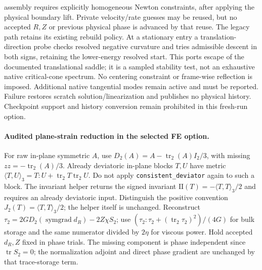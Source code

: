 \documentclass[11pt]{article}
\begin{document}
assembly requires explicitly homogeneous Newton constraints, after applying the
physical boundary lift. Private velocity/rate guesses may be reused, but no
accepted $R,Z$ or previous physical phase is advanced by that reuse.
The legacy path retains its existing rebuild policy.
At a stationary entry a translation-direction probe checks resolved negative
curvature and tries admissible descent in both signs, retaining the lower-energy
resolved start. This ports escape of the documented translational saddle;
it is a sampled stability test, not an exhaustive native critical-cone spectrum.
No centering constraint or frame-wise reflection is imposed. Additional native
tangential modes remain active and must be reported. Failure restores scratch
solution/linearization and publishes no physical history. Checkpoint support
and history conversion remain prohibited in this fresh-run option.


\paragraph{Audited plane-strain reduction in the selected FE option.}
For raw in-plane symmetric $A$, use $D_2(A)=A-\operatorname{tr}_2(A)I_2/3$,
with missing $zz=-\operatorname{tr}_2(A)/3$. Already deviatoric in-plane blocks
$T,U$ have metric $\langle T,U\rangle_3=T:U+\operatorname{tr}_2T\operatorname{tr}_2U$.
Do not apply \texttt{consistent\_deviator} again to such a block. The invariant
helper returns the signed invariant $\mathrm{II}(T)=-\langle T,T\rangle_3/2$
and requires an already deviatoric input. Distinguish the positive convention
$J_2(T)=\langle T,T\rangle_3/2$; the helper itself is unchanged.
Reconstruct $\tau_2=2G D_2(\operatorname{symgrad}d_R)-2Z\chi S_2$;
use $(\tau_2:\tau_2+(\operatorname{tr}_2\tau_2)^2)/(4G)$ for bulk storage
and the same numerator divided by $2\eta$ for viscous power. Hold accepted
$d_R,Z$ fixed in phase trials. The missing component is phase independent since
$\operatorname{tr}S_2=0$; the normalization adjoint and direct phase gradient
are unchanged by that trace-storage term.
\end{document}
